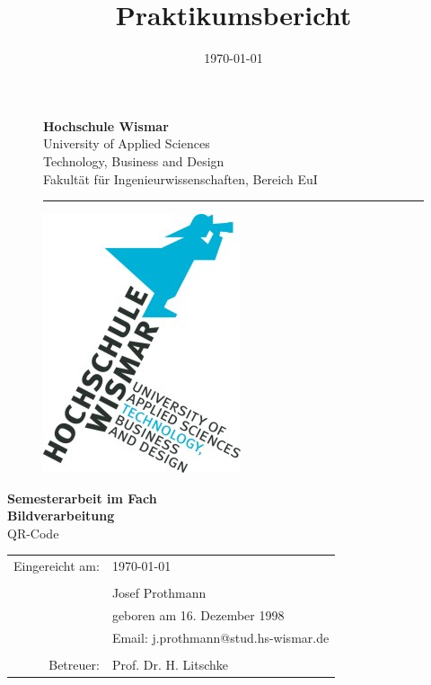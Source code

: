 \documentclass[12pt,					%
							 oneside,			%
							 a4paper,			%
							 halfparskip,		%
							 liststotoc,			%
							 bibtotoc,			%
							 fleqn,				%
							 pointlessnumbers]	%
							 {scrreprt}
\title{Praktikumsbericht}
\author{\Verfasserj}
\date{\today{}}
\makeatletter
\newcommand{\VerfasserJ}{Josef Prothmann}
\newcommand{\EmailJ}{j.prothmann@stud.hs-wismar.de}
\newcommand{\GeburtstagJ}{16. Dezember 1998}
\newcommand{\Titel}{QR-Code}
\newcommand{\Betreuer}{Prof. Dr. H. Litschke}
\makeatother
\begin{document}

	\renewcommand\lstlistingname{Code}
	\renewcommand\lstlistlistingname{Codeverzeichnis}
	
	\begin{titlepage}
		\setlength\headsep{-5mm}
		\begin{figure}[!h]
			\begin{minipage}{0.8\textwidth}
				\textbf{Hochschule Wismar} \\
				University of Applied Sciences \\
				Technology, Business and Design \\
				Fakultät für Ingenieurwissenschaften, Bereich EuI \\
			\rule{\textwidth}{0.5pt}
			\end{minipage}
			\begin{minipage}[r]{0.1\textwidth}
				\begin{flushright}
					\includegraphics[height=6\baselineskip]{pictures/HS-Wismar_Logo-FIW_2010-01.jpg}
				\end{flushright}
			\end{minipage}
		\end{figure}
		\vspace*{6cm}
		\begin{center}
			\Huge
			\textbf{Semesterarbeit im Fach\\ Bildverarbeitung} \\
			\vspace{2cm}
			\large \Titel
			\begin{table}[b]
				\begin{tabular}{rl}
					
					Eingereicht am: &\today \\
					\\
					& \VerfasserJ \\ 
					& geboren am \GeburtstagJ \\ 
					& Email: \EmailJ \\
					\\

					Betreuer: & \Betreuer \\

				\end{tabular}
			\end{table}
		\end{center}
	\end{titlepage}
\end{document}
